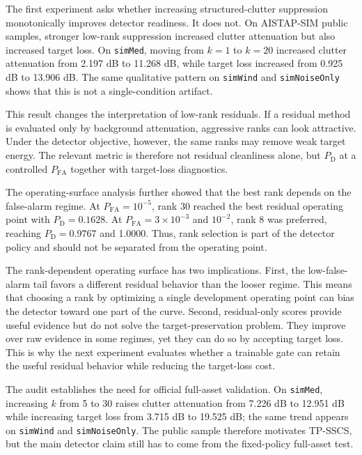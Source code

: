 \documentclass[journal]{IEEEtran}
\begin{document}
The first experiment asks whether increasing structured-clutter suppression monotonically improves detector readiness. It does not. On AISTAP-SIM public samples, stronger low-rank suppression increased clutter attenuation but also increased target loss. On \texttt{simMed}, moving from $k=1$ to $k=20$ increased clutter attenuation from 2.197 dB to 11.268 dB, while target loss increased from 0.925 dB to 13.906 dB. The same qualitative pattern on \texttt{simWind} and \texttt{simNoiseOnly} shows that this is not a single-condition artifact.

This result changes the interpretation of low-rank residuals. If a residual method is evaluated only by background attenuation, aggressive ranks can look attractive. Under the detector objective, however, the same ranks may remove weak target energy. The relevant metric is therefore not residual cleanliness alone, but $P_{\mathrm{D}}$ at a controlled $P_{\mathrm{FA}}$ together with target-loss diagnostics.

The operating-surface analysis further showed that the best rank depends on the false-alarm regime. At $P_{\mathrm{FA}}=10^{-5}$, rank 30 reached the best residual operating point with $P_{\mathrm{D}}=0.1628$. At $P_{\mathrm{FA}}=3 \times 10^{-3}$ and $10^{-2}$, rank 8 was preferred, reaching $P_{\mathrm{D}}=0.9767$ and 1.0000. Thus, rank selection is part of the detector policy and should not be separated from the operating point.

The rank-dependent operating surface has two implications. First, the low-false-alarm tail favors a different residual behavior than the looser regime. This means that choosing a rank by optimizing a single development operating point can bias the detector toward one part of the curve. Second, residual-only scores provide useful evidence but do not solve the target-preservation problem. They improve over raw evidence in some regimes, yet they can do so by accepting target loss. This is why the next experiment evaluates whether a trainable gate can retain the useful residual behavior while reducing the target-loss cost.

The audit establishes the need for official full-asset validation. On \texttt{simMed}, increasing $k$ from 5 to 30 raises clutter attenuation from 7.226 dB to 12.951 dB while increasing target loss from 3.715 dB to 19.525 dB; the same trend appears on \texttt{simWind} and \texttt{simNoiseOnly}. The public sample therefore motivates TP-SSCS, but the main detector claim still has to come from the fixed-policy full-asset test.
\end{document}

